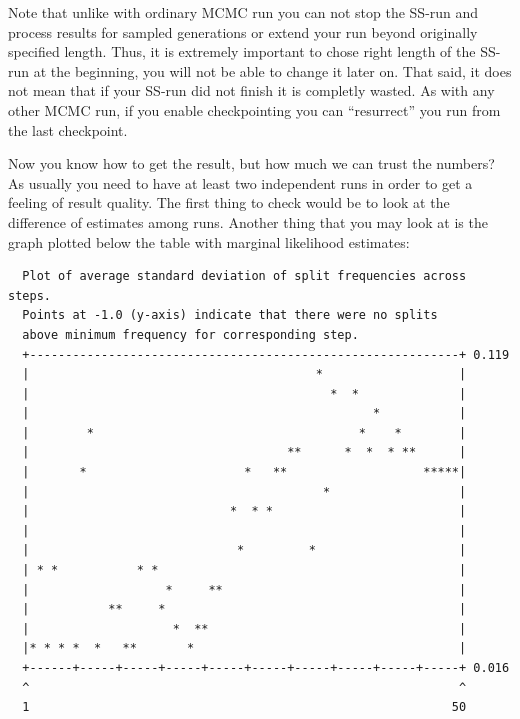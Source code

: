 \documentclass[12pt]{book}
\begin{document}
Note that unlike with ordinary MCMC run you can not stop the SS-run and process results for sampled
generations or extend your run beyond originally specified length. Thus, it is extremely important
to chose right length of the SS-run at the beginning, you will not be able to change it later on.
That said, it does not mean that if your SS-run did not finish it is completly wasted. As with any
other MCMC run, if you enable checkpointing you can ``resurrect'' you run from the last checkpoint.

Now you know how to get the result, but how much we can trust the numbers? As usually you need to
have at least two independent runs in order to get a feeling of result quality. The first thing to
check would be to look at the difference of estimates among runs. Another thing that you may look
at is the graph plotted below the table with marginal likelihood estimates:

\begin{singlespacing}
\footnotesize
\begin{verbatim}
  Plot of average standard deviation of split frequencies across steps.
  Points at -1.0 (y-axis) indicate that there were no splits
  above minimum frequency for corresponding step.
  +------------------------------------------------------------+ 0.119
  |                                        *                   |
  |                                          *  *              |
  |                                                *           |
  |        *                                     *    *        |
  |                                    **      *  *  * **      |
  |       *                      *   **                   *****|
  |                                         *                  |
  |                            *  * *                          |
  |                                                            |
  |                             *         *                    |
  | * *           * *                                          |
  |                   *     **                                 |
  |           **     *                                         |
  |                    *  **                                   |
  |* * * *  *   **       *                                     |
  +------+-----+-----+-----+-----+-----+-----+-----+-----+-----+ 0.016
  ^                                                            ^
  1                                                           50
\end{verbatim}
\end{singlespacing}
\normalsize
\end{document}
